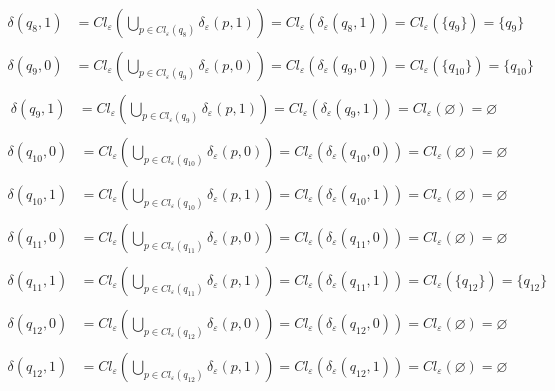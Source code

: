 {\begin{align*}
    \end{align*}
    \begin{align*}
      \delta(q_8, 1) &= Cl_{\varepsilon}(\bigcup_{p \in Cl_{\varepsilon}(q_8)} \delta_{\varepsilon}(p,1)) = Cl_\varepsilon(\delta_\varepsilon(q_8,1)) = Cl_\varepsilon(\{q_9\}) = \{q_9\}\\
    \end{align*}
    \begin{align*}
      \delta(q_9, 0) &= Cl_{\varepsilon}(\bigcup_{p \in Cl_{\varepsilon}(q_9)} \delta_{\varepsilon}(p,0)) = Cl_\varepsilon(\delta_\varepsilon(q_9,0)) = Cl_\varepsilon(\{q_{10}\}) = \{q_{10}\}\\
    \end{align*}
    \begin{align*}
      \delta(q_9, 1) &= Cl_{\varepsilon}(\bigcup_{p \in Cl_{\varepsilon}(q_9)} \delta_{\varepsilon}(p,1)) = Cl_\varepsilon(\delta_\varepsilon(q_9,1)) = Cl_\varepsilon(\varnothing) = \varnothing\\
    \end{align*}
    \begin{align*}
      \delta(q_{10}, 0) &= Cl_{\varepsilon}(\bigcup_{p \in Cl_{\varepsilon}(q_{10})} \delta_{\varepsilon}(p,0)) = Cl_\varepsilon(\delta_\varepsilon(q_{10},0)) = Cl_\varepsilon(\varnothing) = \varnothing\\
    \end{align*}
    \begin{align*}
      \delta(q_{10}, 1) &= Cl_{\varepsilon}(\bigcup_{p \in Cl_{\varepsilon}(q_{10})} \delta_{\varepsilon}(p,1)) = Cl_\varepsilon(\delta_\varepsilon(q_{10},1)) = Cl_\varepsilon(\varnothing) = \varnothing\\
    \end{align*}
    \begin{align*}
      \delta(q_{11}, 0) &= Cl_{\varepsilon}(\bigcup_{p \in Cl_{\varepsilon}(q_{11})} \delta_{\varepsilon}(p,0)) = Cl_\varepsilon(\delta_\varepsilon(q_{11},0)) = Cl_\varepsilon(\varnothing) = \varnothing\\
    \end{align*}
    \begin{align*}
      \delta(q_{11}, 1) &= Cl_{\varepsilon}(\bigcup_{p \in Cl_{\varepsilon}(q_{11})} \delta_{\varepsilon}(p,1)) = Cl_\varepsilon(\delta_\varepsilon(q_{11},1)) = Cl_\varepsilon(\{q_{12}\}) = \{q_{12}\}\\
    \end{align*}
    \begin{align*}
      \delta(q_{12}, 0) &= Cl_{\varepsilon}(\bigcup_{p \in Cl_{\varepsilon}(q_{12})} \delta_{\varepsilon}(p,0)) = Cl_\varepsilon(\delta_\varepsilon(q_{12},0)) = Cl_\varepsilon(\varnothing) = \varnothing\\
    \end{align*}
    \begin{align*}
      \delta(q_{12}, 1) &= Cl_{\varepsilon}(\bigcup_{p \in Cl_{\varepsilon}(q_{12})} \delta_{\varepsilon}(p,1)) = Cl_\varepsilon(\delta_\varepsilon(q_{12},1)) = Cl_\varepsilon(\varnothing) = \varnothing\\
    \end{align*}

}
